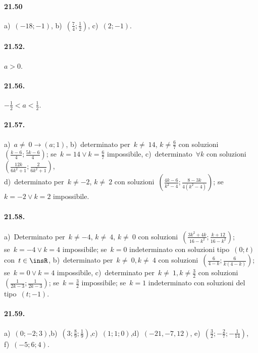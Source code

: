 \paragraph{21.50} a)~$(-18;-1)$, \quad b)~$\left(\frac{7}{4};\frac{1}{2}\right)$, \quad c)~$(2;-1)$.

\paragraph{21.52.} $a>0$.

\paragraph{21.56.} $-\frac{1}{2}<a<\frac{1}{2}$.

\paragraph{21.57.} a)~$a\neq~0\rightarrow (a;1)$,
\quad b)~determinato per~$k\neq~14$, $k\neq \frac{6}{7}$ con soluzioni~$\left(\frac{k-6}{4}; \frac{5k-6}{4}\right)$;
se~$k=14\vee k=\frac{6}{7}$ impossibile,
\quad c)~determinato~$\forall k$ con soluzioni~$\left(\frac{12k}{6k^{2}+1};\frac{2}{6k^{2}+1}\right)$,
\protect\\ d)~determinato per~$k\neq -2$, $k\neq~2$ con soluzioni~$\left(\frac{4k-6}{k^{2}-4}; \frac{8-3k}{4(k^{2}-4)}\right)$; se~$k=-2 \vee k=2$ impossibile.

\paragraph{21.58.} a)~Determinato per~$k\neq -4$, $k\neq~4$, $k\neq~0$ con soluzioni~$\left(\frac{3k^{2}+4k}{16-k^{2}}; \frac{k+12}{16-k^{2}}\right)$;\protect\\
se~$k=-4\vee k=4$ impossibile; se~$k=0$ indeterminato con soluzioni tipo~$(0;t)$ con~$t\in\insR$,
\quad b)~determinato per~$k\neq~0, k\neq~4$ con soluzioni~$\left(\frac{6}{4-k}; \frac{6}{k(4-k)}\right)$;
se~$k=0\vee k=4$ impossibile,
\quad c)~determinato per~$k\neq~1, k\neq \frac{3}{2}$ con soluzioni~$\left(\frac{1}{2k-3}; \frac{1}{2k-3}\right)$;
se~$k=\frac{3}{2}$ impossibile; se~$k=1$ indeterminato con soluzioni del tipo~$(t;-1)$.

\paragraph{21.59.} a)~$(0; -2; 3)$,\quad b)~$\left(3;\frac{8}{9};\frac{1}{9}\right)$,\quad c)~$(1; 1;0)$,\quad d)~$(-21, -7, 12)$, \quad e)~$\left(\frac{3}{2};-\frac{2}{7};-\frac{1}{14}\right)$,\protect\\ f)~$(-5; 6; 4)$.

